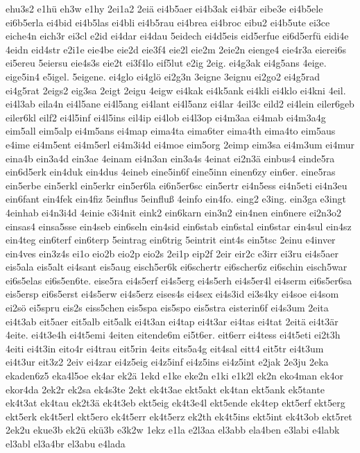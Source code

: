 {ehu3s2
e1hü
eh3w
e1hy
2ei1a2
2eiä
ei4b5aer
ei4b3ak
ei4bär
eibe3e
ei4b5ele
ei6b5erla
ei4bid
ei4b5las
ei4bli
ei4b5rau
ei4brea
ei4broc
eibu2
ei4b5ute
ei3ce
eiche4n
eich3r
ei3cl
e2id
ei4dar
ei4dau
5eidech
ei4d5eis
eid5erfue
ei6d5erfü
eidi4e
4eidn
eid4str
e2i1e
eie4be
eie2d
eie3f4
eie2l
eie2m
2eie2n
eienge4
eie4r3a
eierei6s
ei5ereu
5eiersu
eie4s3s
eie2t
ei3f4lo
eif5lut
e2ig
2eig.
ei4g3ak
ei4g5ans
4eige.
eige5in4
e5igel.
5eigene.
ei4glo
ei4glö
ei2g3n
3eigne
3eignu
ei2go2
ei4g5rad
ei4g5rat
2eigs2
eig3sa
2eigt
2eigu
4eigw
ei4kak
ei4k5ank
ei4kli
ei4klo
ei4kni
4eil.
ei4l3ab
eila4n
ei4l5ane
ei4l5ang
ei4lant
ei4l5anz
ei4lar
4eil3c
eild2
ei4lein
eiler6geb
eiler6kl
eilf2
ei4l5inf
ei4l5ins
eil4ip
ei4lob
ei4l3op
ei4m3aa
ei4mab
ei4m3a4g
eim5all
eim5alp
ei4m5ans
ei4map
eima4ta
eima6ter
eima4th
eima4to
eim5aus
e4ime
ei4m5ent
ei4m5erl
ei4m3i4d
ei4moe
eim5org
2eimp
eim3sa
ei4m3um
ei4mur
eina4b
ein3a4d
ein3ae
4einam
ei4n3an
ein3a4s
4einat
ei2n3ä
einbus4
einde5ra
ein6d5erk
ein4duk
ein4dus
4eineb
eine5in6f
eine5inn
einen6zy
ein6er.
eine5ras
ein5erbe
ein5erkl
ein5erkr
ein5er6la
ei6n5er6sc
ein5ertr
ei4n5ess
ei4n5eti
ei4n3eu
ein6fant
ein4fek
ein4fiz
5einflus
5einfluß
4einfo
ein4fo.
eing2
e3ing.
ein3ga
e3ingt
4einhab
ei4n3i4d
4einie
e3i4nit
eink2
ein6karn
ein3n2
ein4nen
ein6nere
ei2n3o2
einsas4
einsa5sse
ein4seb
ein6seln
ein4sid
ein6stab
ein6stal
ein6star
ein4sul
ein4sz
ein4teg
ein6terf
ein6terp
5eintrag
ein6trig
5eintrit
eint4s
ein5tsc
2einu
e4inver
ein4ves
ein3z4s
ei1o
eio2b
eio2p
eio2s
2ei1p
eip2f
2eir
eir2c
e3irr
ei3ru
ei4s5aer
eis5ala
eis5alt
ei4sant
eis5aug
eisch5er6k
ei6schertr
ei6scher6z
ei6schin
eisch5war
ei6s5elas
ei6s5en6te.
eise5ra
ei4s5erf
ei4s5erg
ei4s5erh
ei4s5er4l
ei4serm
ei6s5er6sa
eis5ersp
ei6s5erst
ei4s5erw
ei4s5erz
eises4s
ei4sex
ei4s3id
ei3s4ky
ei4soe
ei4som
ei2sö
ei5spru
eis2s
eiss5chen
eis5spa
eis5spo
eis5stra
eisterin6f
ei4s3um
2eita
ei4t3ab
eit5aer
eit5alb
eit5alk
ei4t3an
ei4tap
ei4t3ar
ei4tas
ei4tat
2eitä
ei4t3är
4eite.
ei4t3e4h
ei4t5emi
4eiten
eitende6m
ei5t6er.
eit6err
ei4tess
ei4t5eti
ei2t3h
4eiti
ei4t3in
eito4r
ei4trau
eit5rin
4eits
eits5a4g
eit4sal
eitt4
eit5tr
ei4t3um
ei4t3ur
eit3z2
2eiv
ei4zar
ei4z5eig
ei4z5inf
ei4z5ins
ei4z5int
e2jak
2e3ju
2eka
ekaden6z5
eka4l5oe
ek4ar
ek2ä
1ekd
e1ke
eke2n
e1ki
e1k2l
ek2n
eko4man
ek4or
ekor4da
2ek2r
ek2sa
ek4s3te
2ekt
ek4t3ae
ekt5akt
ek4tan
ekt5ank
ek5tante
ek4t3at
ek4tau
ek2t3ä
ek4t3eb
ekt5eig
ek4t3e4l
ekt5ende
ek4tep
ekt5erf
ekt5erg
ekt5erk
ek4t5erl
ekt5ero
ek4t5err
ek4t5erz
ek2th
ek4t5ins
ekt5int
ek4t3ob
ekt5ret
2ek2u
ekue3b
ek2ü
ekü3b
e3k2w
1ekz
e1la
e2l3aa
el3abb
ela4ben
e3labi
e4labk
el3abl
el3a4br
el3abu
e4lada
}
